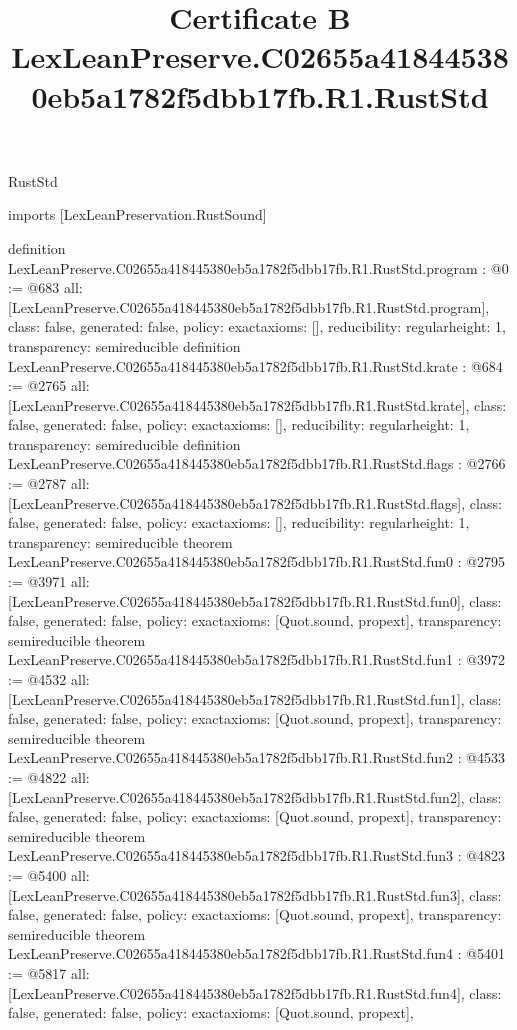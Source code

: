\begin{lexlean}{RustStd}
\title{Certificate B LexLeanPreserve.C02655a418445380eb5a1782f5dbb17fb.R1.RustStd}
\begin{coremodule}
imports [LexLeanPreservation.RustSound]

definition LexLeanPreserve.C02655a418445380eb5a1782f5dbb17fb.R1.RustStd.program : @0 := @683 {
  all: [LexLeanPreserve.C02655a418445380eb5a1782f5dbb17fb.R1.RustStd.program],
  class: false,
  generated: false,
  policy: exact{axioms: []},
  reducibility: regular{height: 1},
  transparency: semireducible
}
definition LexLeanPreserve.C02655a418445380eb5a1782f5dbb17fb.R1.RustStd.krate : @684 := @2765 {
  all: [LexLeanPreserve.C02655a418445380eb5a1782f5dbb17fb.R1.RustStd.krate],
  class: false,
  generated: false,
  policy: exact{axioms: []},
  reducibility: regular{height: 1},
  transparency: semireducible
}
definition LexLeanPreserve.C02655a418445380eb5a1782f5dbb17fb.R1.RustStd.flags : @2766 := @2787 {
  all: [LexLeanPreserve.C02655a418445380eb5a1782f5dbb17fb.R1.RustStd.flags],
  class: false,
  generated: false,
  policy: exact{axioms: []},
  reducibility: regular{height: 1},
  transparency: semireducible
}
theorem LexLeanPreserve.C02655a418445380eb5a1782f5dbb17fb.R1.RustStd.fun0 : @2795 := @3971 {
  all: [LexLeanPreserve.C02655a418445380eb5a1782f5dbb17fb.R1.RustStd.fun0],
  class: false,
  generated: false,
  policy: exact{axioms: [Quot.sound, propext]},
  transparency: semireducible
}
theorem LexLeanPreserve.C02655a418445380eb5a1782f5dbb17fb.R1.RustStd.fun1 : @3972 := @4532 {
  all: [LexLeanPreserve.C02655a418445380eb5a1782f5dbb17fb.R1.RustStd.fun1],
  class: false,
  generated: false,
  policy: exact{axioms: [Quot.sound, propext]},
  transparency: semireducible
}
theorem LexLeanPreserve.C02655a418445380eb5a1782f5dbb17fb.R1.RustStd.fun2 : @4533 := @4822 {
  all: [LexLeanPreserve.C02655a418445380eb5a1782f5dbb17fb.R1.RustStd.fun2],
  class: false,
  generated: false,
  policy: exact{axioms: [Quot.sound, propext]},
  transparency: semireducible
}
theorem LexLeanPreserve.C02655a418445380eb5a1782f5dbb17fb.R1.RustStd.fun3 : @4823 := @5400 {
  all: [LexLeanPreserve.C02655a418445380eb5a1782f5dbb17fb.R1.RustStd.fun3],
  class: false,
  generated: false,
  policy: exact{axioms: [Quot.sound, propext]},
  transparency: semireducible
}
theorem LexLeanPreserve.C02655a418445380eb5a1782f5dbb17fb.R1.RustStd.fun4 : @5401 := @5817 {
  all: [LexLeanPreserve.C02655a418445380eb5a1782f5dbb17fb.R1.RustStd.fun4],
  class: false,
  generated: false,
  policy: exact{axioms: [Quot.sound, propext]},
}
\end{coremodule}
\end{lexlean}
